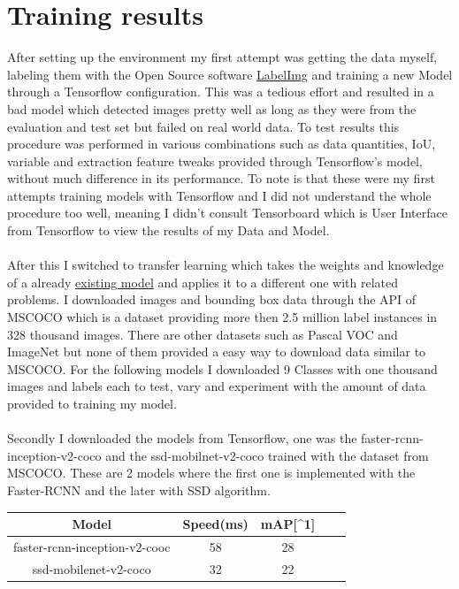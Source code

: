 \section{Training results}
After setting up the environment my first attempt was getting the data myself, labeling them with the Open Source software
\href{https://github.com/tzutalin/labelImg}{LabelImg} and training a new Model through a Tensorflow configuration. This was a tedious effort and
resulted in a bad model which detected images pretty well as long as they were from the evaluation and test set but failed on real world
data. To test results this procedure was performed in various combinations such as data quantities, IoU, variable and extraction feature
tweaks provided through Tensorflow's model, without much difference in its performance. To note is that these were my first attempts
training models with Tensorflow and I did not understand the whole procedure too well, meaning I didn't consult Tensorboard which is User
Interface from Tensorflow to view the results of my Data and Model.\\ \\
After this I switched to transfer learning which takes the weights and knowledge of a already
\href{https://github.com/tensorflow/models/blob/master/research/object_detection/g3doc/detection_model_zoo.md}{existing model} and applies it to a different one with related problems. 
I downloaded images and bounding box data through the API of MSCOCO which is a dataset providing more then 2.5 million label
instances in 328 thousand images.\cite{mscoco} There are other datasets such as Pascal VOC and ImageNet but none of them provided a easy way to
download data similar to MSCOCO. For the following models I downloaded 9 Classes with one thousand images and labels each to test, vary and experiment
with the amount of data provided to training my model.\\\\
Secondly I downloaded the models from Tensorflow, one was the faster-rcnn-inception-v2-coco and the ssd-mobilnet-v2-coco trained with the
dataset from MSCOCO. These are 2 models where the first one is implemented with the Faster-RCNN and the later with SSD algorithm. \\
\begin{center}
    \begin{tabular}{|c|c|c|c|c|}
        \hline
        Model & Speed(ms) &  mAP[{\textasciicircum}1] \\ \hline
        faster-rcnn-inception-v2-cooc & 58 & 28 \\ \hline
        ssd-mobilenet-v2-coco & 32 & 22 \\ \hline
    \end{tabular}
\end{center}
